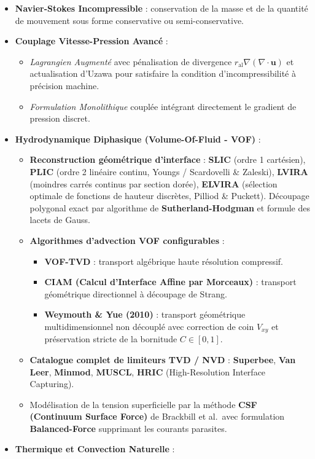 \documentclass[
  french,
]{article}
\providecommand{\tightlist}{%
  \setlength{\itemsep}{0pt}\setlength{\parskip}{0pt}}
\begin{document}
\begin{itemize}
\tightlist
\item
  \textbf{Navier-Stokes Incompressible} : conservation de la masse et de
  la quantité de mouvement sous forme conservative ou semi-conservative.
\item
  \textbf{Couplage Vitesse-Pression Avancé} :

  \begin{itemize}
  \tightlist
  \item
    \emph{Lagrangien Augmenté} avec pénalisation de divergence
    \(r_{\text{al}} \nabla(\nabla \cdot \mathbf{u})\) et actualisation
    d'Uzawa pour satisfaire la condition d'incompressibilité à précision
    machine.
  \item
    \emph{Formulation Monolithique} couplée intégrant directement le
    gradient de pression discret.
  \end{itemize}
\item
  \textbf{Hydrodynamique Diphasique (Volume-Of-Fluid - VOF)} :

  \begin{itemize}
  \tightlist
  \item
    \textbf{Reconstruction géométrique d'interface} : \textbf{SLIC}
    (ordre 1 cartésien), \textbf{PLIC} (ordre 2 linéaire continu, Youngs
    / Scardovelli \& Zaleski), \textbf{LVIRA} (moindres carrés continus
    par section dorée), \textbf{ELVIRA} (sélection optimale de fonctions
    de hauteur discrètes, Pilliod \& Puckett). Découpage polygonal exact
    par algorithme de \textbf{Sutherland-Hodgman} et formule des lacets
    de Gauss.
  \item
    \textbf{Algorithmes d'advection VOF configurables} :

    \begin{itemize}
    \tightlist
    \item
      \textbf{VOF-TVD} : transport algébrique haute résolution
      compressif.
    \item
      \textbf{CIAM (Calcul d'Interface Affine par Morceaux)} : transport
      géométrique directionnel à découpage de Strang.
    \item
      \textbf{Weymouth \& Yue (2010)} : transport géométrique
      multidimensionnel non découplé avec correction de coin \(V_{xy}\)
      et préservation stricte de la bornitude \(C \in [0, 1]\).
    \end{itemize}
  \item
    \textbf{Catalogue complet de limiteurs TVD / NVD} :
    \textbf{Superbee}, \textbf{Van Leer}, \textbf{Minmod},
    \textbf{MUSCL}, \textbf{HRIC} (High-Resolution Interface Capturing).
  \item
    Modélisation de la tension superficielle par la méthode \textbf{CSF
    (Continuum Surface Force)} de Brackbill et al.~avec formulation
    \textbf{Balanced-Force} supprimant les courants parasites.
  \end{itemize}
\item
  \textbf{Thermique et Convection Naturelle} :


\end{itemize}
\end{document}
